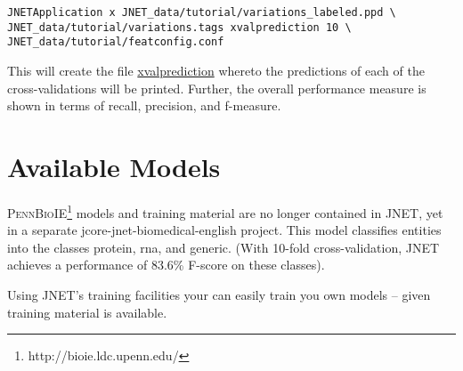 \documentclass[11pt,a4paper,halfparskip]{scrartcl}
\begin{document}
\begin{verbatim}
JNETApplication x JNET_data/tutorial/variations_labeled.ppd \
JNET_data/tutorial/variations.tags xvalprediction 10 \
JNET_data/tutorial/featconfig.conf
\end{verbatim}

This will create the file \url{xvalprediction} whereto the predictions of
each of the cross-validations will be printed. Further, the overall
performance measure is shown in terms of recall, precision, and f-measure.


\section{Available Models}
\textsc{PennBioIE}\footnote{http://bioie.ldc.upenn.edu/} models and training material are no longer contained in JNET, yet in a separate jcore-jnet-biomedical-english project. This model classifies entities into the classes protein, rna, and
generic. (With 10-fold cross-validation, JNET achieves a performance
of 83.6\% F-score on these classes).

Using JNET's training facilities your can easily train you own models
-- given training material is available.




\end{document}
